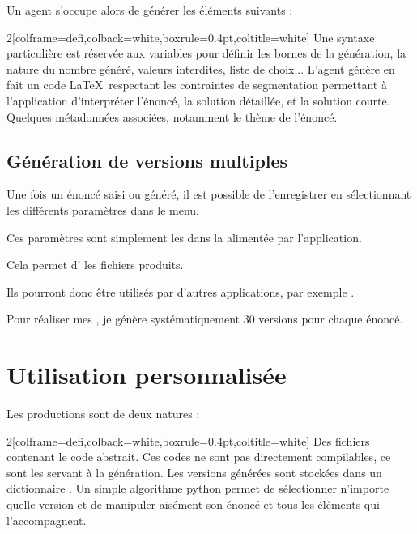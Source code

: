 Un agent s'occupe alors de générer les éléments suivants : 
\begin{MultiColonnes}{2}[colframe=defi,colback=white,boxrule=0.4pt,coltitle=white]
    \tcbitem[title=Variables] Une syntaxe particulière est réservée aux variables pour définir les bornes de la génération, la nature du nombre généré, valeurs interdites, liste de choix...
    \tcbitem[title=Code \LaTeX] L'agent génère en fait un code \LaTeX\ respectant les contraintes de segmentation permettant à l'application d'interpréter l'énoncé, la solution détaillée, et la solution courte. 
    \tcbitem[title=Métadonnées] Quelques métadonnées associées, notamment le thème de l'énoncé. 
\end{MultiColonnes}

\subsection{Génération de versions multiples}
Une fois un énoncé saisi ou généré, il est possible de l'enregistrer en sélectionnant les différents paramètres dans le menu. 

Ces paramètres sont simplement les  dans la  alimentée par l'application. 

Cela permet d' les fichiers produits. 

Ils pourront donc être utilisés par d'autres applications, par exemple . 

Pour réaliser mes , je génère systématiquement $30$ versions pour chaque énoncé. 


\section{Utilisation personnalisée}

Les productions sont de deux natures : 

\begin{MultiColonnes}{2}[colframe=defi,colback=white,boxrule=0.4pt,coltitle=white]
    \tcbitem[title=Inputs] Des fichiers  contenant le code abstrait. 
    Ces codes ne sont pas directement compilables, ce sont les  servant à la génération. 
    \tcbitem[title=json\_productions] Les versions générées sont stockées dans un dictionnaire . Un simple algorithme python permet de sélectionner n'importe quelle version et de manipuler aisément son énoncé et tous les éléments qui l'accompagnent. 
\end{MultiColonnes}
